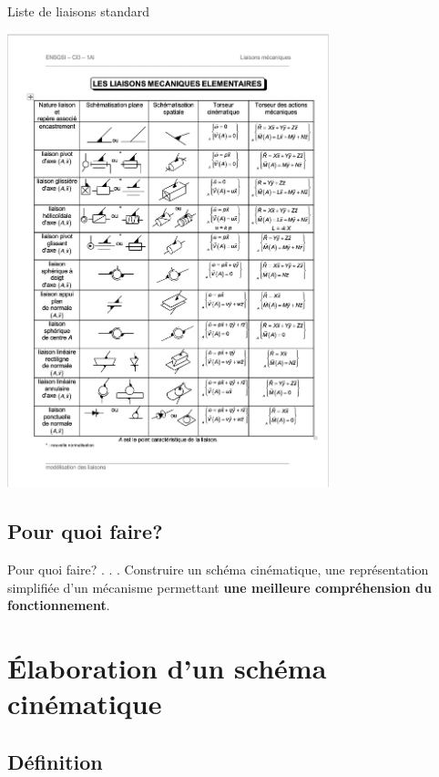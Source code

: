 \documentclass[
  ignorenonframetext,
  aspectratio=169,
  c]{beamer}
\begin{document}
\begin{frame}{Liste de liaisons standard}
\label{liste-de-liaisons-standard}
\begin{center}
\includegraphics[width=0.7\textwidth,height=\textheight]{CM3/Liaisons.png}
\end{center}
\end{frame}

\subsection{Pour quoi faire?}\label{pour-quoi-faire}

\begin{frame}{Pour quoi faire?}
. . . Construire un schéma cinématique, une représentation simplifiée
d'un mécanisme permettant \textbf{une meilleure compréhension du
fonctionnement}.
\end{frame}

\section{Élaboration d'un schéma
cinématique}\label{uxe9laboration-dun-schuxe9ma-cinuxe9matique}

\subsection{Définition}\label{duxe9finition}
\end{document}
